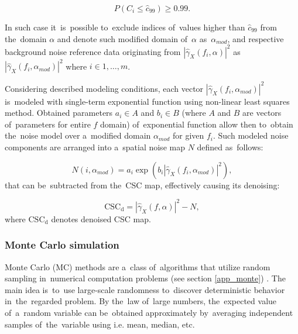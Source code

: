 \begin{equation}
  P\left( C_i\leq\hat{c}_{99} \right)\geq 0.99.
\end{equation}

In such case it~is~possible to~exclude indices of~values higher than $\hat{c}_{99}$ from the~domain $\alpha$ and denote such modified domain of~$\alpha$ as~$\alpha_{mod}$, and respective background noise reference data originating from $\left|\hat{\gamma}_X(f_i,\alpha)\right|^{2}$ as~$\left|\hat{\gamma}_X(f_i,\alpha_{mod})\right|^{2}$ where $i \in 1, \dots, m$.

Considering described modeling conditions, each vector $\left|\hat{\gamma}_X(f_i,\alpha_{mod})\right|^{2}$ is~modeled with single-term exponential function using non-linear least squares method. Obtained parameters $a_i \in A$ and $b_i \in B$ (where $A$ and $B$ are vectors of~parameters for entire $f$ domain) of~exponential function allow then to~obtain the~noise model over a~modified domain $\alpha_{mod}$ for given $f_i$. Such modeled noise components are arranged into a~spatial noise map $N$ defined as~follows:

\begin{equation}
  N(i,\alpha_{mod})=a_i \exp \left( b_i \left|\hat{\gamma}_X(f_i,\alpha_{mod})\right|^{2}\right),
\end{equation}
that can be~subtracted from the~CSC map, effectively causing its denoising:

\begin{equation}
  \mathrm{CSC_d}= \left|\hat{\gamma}_X(f,\alpha)\right|^{2}-N,
\end{equation}
where $\mathrm{CSC_d}$ denotes denoised CSC map.


\subsubsection{Monte Carlo simulation}\label{mcmc}

Monte Carlo (MC) methods are a~class of~algorithms that utilize random sampling in~numerical computation problems (see section \ref{app_monte}) \cite{metropolis1987beginning, metropolis1949monte}. The main idea is~to~use large-scale randomness to~discover deterministic behavior in~the~regarded problem. By the~law of~large numbers, the~expected value of~a~random variable can be~obtained approximately by~averaging independent samples of~the~variable using i.e. mean, median, etc. 

